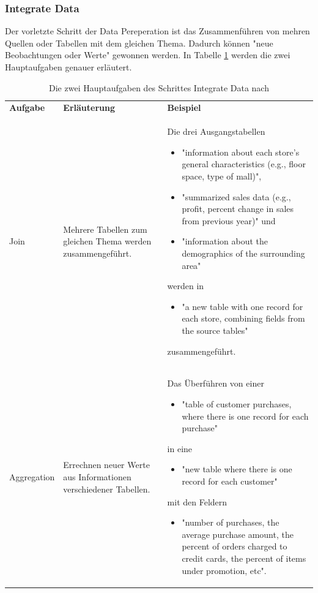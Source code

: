 \subsubsection{Integrate Data}
Der vorletzte Schritt der Data Pereperation ist das Zusammenführen von mehren Quellen oder Tabellen mit dem gleichen Thema. Dadurch können "neue Beobachtungen oder Werte"\citep[S.~22]{chapman_crisp-dm_2000} gewonnen werden. In Tabelle \ref{tab:integrateDataO} werden die zwei Hauptaufgaben\citep[S.~17]{shearer_crisp-dm_2000} genauer erläutert.
\begin{table}[H] \centering
\begin{tabular}{|p{2cm}|p{3.5cm}|p{10cm}|}
\hline
\textbf{Aufgabe} & \textbf{Erläuterung} & \textbf{Beispiel}\\
\hhline{===}
Join & Mehrere Tabellen zum gleichen Thema werden zusammengeführt. & Die drei Ausgangstabellen
\begin{itemize}
\item "information about each store’s general characteristics (e.g., floor space, type of mall)",
\item "summarized sales data (e.g., profit, percent change in sales from previous year)" und
\item "information about the demographics of the surrounding area"
\end{itemize}
werden in 
\begin{itemize}
\item "a new table with one record for each store, combining fields from the source tables"\citep[S.~16]{shearer_crisp-dm_2000}
\end{itemize}
zusammengeführt. \\ \hline
Aggregation &  Errechnen neuer Werte aus Informationen verschiedener Tabellen. & Das Überführen von einer
\begin{itemize}
\item "table of customer purchases, where there is one record for each purchase"
\end{itemize}
in eine 
\begin{itemize}
\item "new table where there is one record for each customer"
\end{itemize}
mit den Feldern 
\begin{itemize}
\item "number of purchases, the average purchase amount, the percent of orders charged to credit cards, the
percent of items under promotion, etc".\citep[S.~17]{shearer_crisp-dm_2000}
\end{itemize}
\\
   \hline
\end{tabular}
\caption{Die zwei Hauptaufgaben des Schrittes Integrate Data nach \citep[S.~17]{shearer_crisp-dm_2000}}
\label{tab:integrateDataO}
\end{table}

